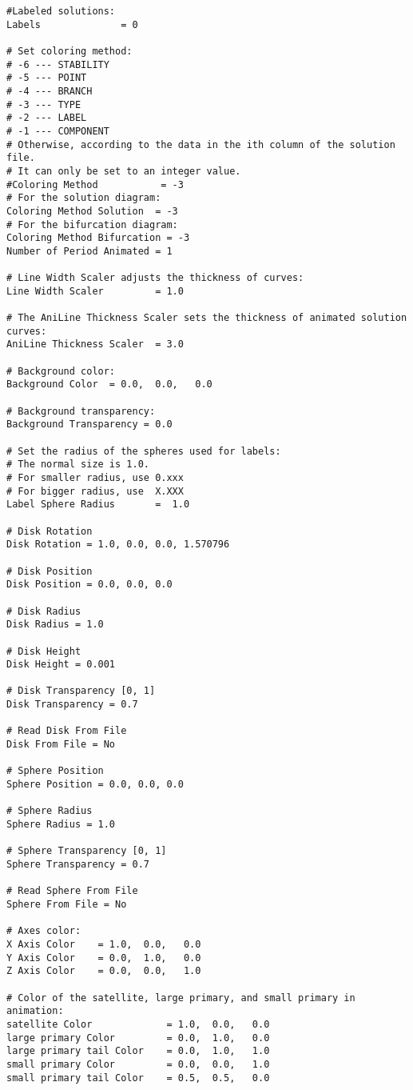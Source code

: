 {\begin{verbatim}
#Labeled solutions:
Labels              = 0

# Set coloring method:
# -6 --- STABILITY
# -5 --- POINT
# -4 --- BRANCH
# -3 --- TYPE
# -2 --- LABEL
# -1 --- COMPONENT
# Otherwise, according to the data in the ith column of the solution file.
# It can only be set to an integer value.
#Coloring Method           = -3
# For the solution diagram:
Coloring Method Solution  = -3
# For the bifurcation diagram:
Coloring Method Bifurcation = -3
Number of Period Animated = 1

# Line Width Scaler adjusts the thickness of curves:
Line Width Scaler         = 1.0

# The AniLine Thickness Scaler sets the thickness of animated solution curves:
AniLine Thickness Scaler  = 3.0

# Background color:
Background Color  = 0.0,  0.0,   0.0

# Background transparency:
Background Transparency = 0.0

# Set the radius of the spheres used for labels:
# The normal size is 1.0.
# For smaller radius, use 0.xxx
# For bigger radius, use  X.XXX
Label Sphere Radius       =  1.0

# Disk Rotation
Disk Rotation = 1.0, 0.0, 0.0, 1.570796

# Disk Position
Disk Position = 0.0, 0.0, 0.0

# Disk Radius
Disk Radius = 1.0

# Disk Height
Disk Height = 0.001

# Disk Transparency [0, 1]
Disk Transparency = 0.7

# Read Disk From File
Disk From File = No

# Sphere Position
Sphere Position = 0.0, 0.0, 0.0

# Sphere Radius
Sphere Radius = 1.0

# Sphere Transparency [0, 1]
Sphere Transparency = 0.7

# Read Sphere From File
Sphere From File = No

# Axes color:
X Axis Color    = 1.0,  0.0,   0.0
Y Axis Color    = 0.0,  1.0,   0.0
Z Axis Color    = 0.0,  0.0,   1.0

# Color of the satellite, large primary, and small primary in animation:
satellite Color             = 1.0,  0.0,   0.0
large primary Color         = 0.0,  1.0,   0.0
large primary tail Color    = 0.0,  1.0,   1.0
small primary Color         = 0.0,  0.0,   1.0
small primary tail Color    = 0.5,  0.5,   0.0


\end{verbatim}}
